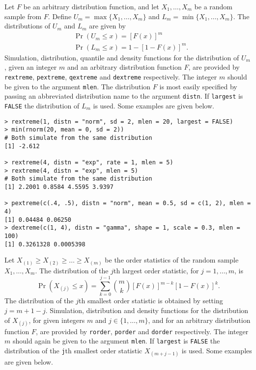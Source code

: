 \documentclass[11pt,a4paper]{article}
\begin{document}
Let $F$ be an arbitrary distribution function, and let $X_1,\dots,X_m$ be a random sample from $F$.
Define $U_m=\max\{X_1,\dots,X_m\}$ and $L_m=\min\{X_1,\dots,X_m\}$.
The distributions of $U_m$ and $L_m$ are given by
\begin{align}
&\Pr(U_m \leq x) = [F(x)]^m 
\label{maxdens} \\
&\Pr(L_m \leq x) = 1 - [1 - F(x)]^m.
\label{mindens}
\end{align}
Simulation, distribution, quantile and density functions for the distribution of $U_m$, given an integer $m$ and an arbitrary distribution function $F$, are provided by \verb+rextreme+, \verb+pextreme+, \verb+qextreme+ and \verb+dextreme+ respectively.
The integer $m$ should be given to the argument \verb+mlen+.
The distribution $F$ is most easily specified by passing an
abbreviated distribution name to the argument \verb+distn+.
If \verb+largest+ is \verb+FALSE+ the distribution of $L_m$ is used. 
Some examples are given below.

\begin{verbatim}
> rextreme(1, distn = "norm", sd = 2, mlen = 20, largest = FALSE)
> min(rnorm(20, mean = 0, sd = 2))
# Both simulate from the same distribution
[1] -2.612

> rextreme(4, distn = "exp", rate = 1, mlen = 5)
> rextreme(4, distn = "exp", mlen = 5)
# Both simulate from the same distribution
[1] 2.2001 0.8584 4.5595 3.9397

> pextreme(c(.4, .5), distn = "norm", mean = 0.5, sd = c(1, 2), mlen = 4)
[1] 0.04484 0.06250
> dextreme(c(1, 4), distn = "gamma", shape = 1, scale = 0.3, mlen = 100)
[1] 0.3261328 0.0005398
\end{verbatim}

Let $X_{(1)} \geq X_{(2)} \geq \dots \geq X_{(m)}$ be the order statistics of the random sample $X_1,\dots,X_m$.
The distribution of the $j$th largest order statistic, for $j = 1,\dots,m$, is
\begin{equation}
\Pr(X_{(j)} \leq x) = \sum_{k=0}^{j-1} \binom{m}{k} [F(x)]^{m-k} [1 - F(x)]^k.
\label{orderdens}
\end{equation}
The distribution of the $j$th smallest order statistic is obtained by setting $j = m + 1 - j$.
Simulation, distribution and density functions for the distribution of $X_{(j)}$, for given integers $m$ and $j \in \{1,\dots,m\}$, and for an arbitrary distribution function $F$, are provided by \verb+rorder+, \verb+porder+ and \verb+dorder+ respectively.
The integer $m$ should again be given to the argument \verb+mlen+.
If \verb+largest+ is \verb+FALSE+ the distribution of the \verb+j+th smallest order statistic $X_{(m+j-1)}$ is used.
Some examples are given below.
\end{document}
